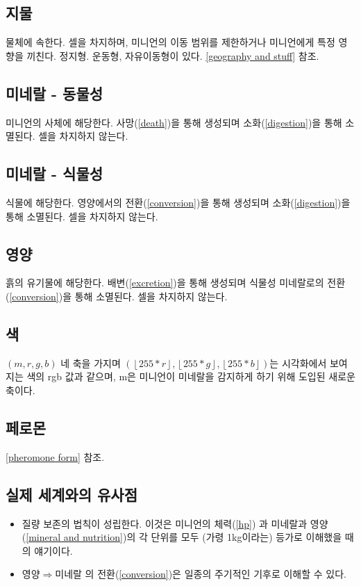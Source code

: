 \documentclass[a4paper,12pt]{article}
\newcommand{\floor}[1]{\left\lfloor{#1}\right\rfloor}
\begin{document}
\subsection{지물}\label{stuff}
물체에 속한다.
셀을 차지하며, 미니언의 이동 범위를 제한하거나 미니언에게 특정 영향을 끼친다. 
정지형. 운동형, 자유이동형이 있다. \ref{geography and stuff} 참조.

\subsection{미네랄 - 동물성}\label{animal mineral}
미니언의 사체에 해당한다. 
사망(\ref{death})을 통해 생성되며 소화(\ref{digestion})을 통해 소멸된다. 
셀을 차지하지 않는다. 

\subsection{미네랄 - 식물성}\label{plant mineral}
식물에 해당한다. 
영양에서의 전환(\ref{conversion})을 통해 생성되며 소화(\ref{digestion})을 통해 소멸된다. 
셀을 차지하지 않는다. 

\subsection{영양}\label{nutrition}
흙의 유기물에 해당한다.
배변(\ref{excretion})을 통해 생성되며 식물성 미네랄로의 전환(\ref{conversion})을 통해 소멸된다.
셀을 차지하지 않는다. 

\subsection{색}\label{color}
$(m,r,g,b)$ 네 축을 가지며 $(\floor{255*r},\floor{255*g},\floor{255*b})$는 시각화에서 보여지는 색의 rgb 값과 같으며, m은 미니언이 미네랄을 감지하게 하기 위해 도입된 새로운 축이다. 

\subsection{페로몬}\label{pheromone}
\ref{pheromone form} 참조.

\subsection{실제 세계와의 유사점}\label{similarity to real world}
\begin{itemize}
\item 질량 보존의 법칙이 성립한다. 이것은 미니언의 체력(\ref{hp}) 과 미네랄과 영양(\ref{mineral and nutrition})의 각 단위를 모두 (가령 1kg이라는) 등가로 이해했을 때의 얘기이다. 
\item 영양$\Rightarrow$미네랄 의 전환(\ref{conversion})은 일종의 주기적인 기후로 이해할 수 있다.  
\end{itemize}
\end{document}
